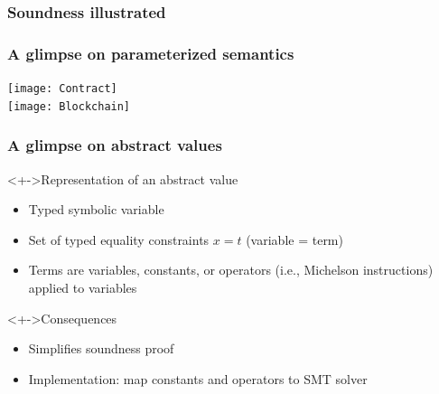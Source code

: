 \documentclass[aspectratio=1610]{beamer}
\begin{document}
\begin{frame}
  \frametitle{Soundness illustrated}
  \begin{center}
\end{center}
\end{frame}
\begin{frame}
  \frametitle{A glimpse on parameterized semantics}
  \begin{flushleft}
    \texttt{[image: Contract]}
    \\
    \texttt{[image: Blockchain]}
  \end{flushleft}
\end{frame}
\begin{frame}
  \frametitle{A glimpse on abstract values}
  \begin{block}<+->{Representation of an abstract value}
    \begin{itemize}
    \item Typed symbolic variable
    \item Set of typed equality constraints \quad $x = t$ \quad (variable = term)
    \item Terms are variables, constants, or operators (i.e., Michelson instructions) applied to variables
    \end{itemize}
  \end{block}
  \begin{block}<+->{Consequences}
    \begin{itemize}
    \item Simplifies soundness proof
    \item Implementation: map constants and operators to SMT solver
    \end{itemize}
  \end{block}
\end{frame}
\end{document}
